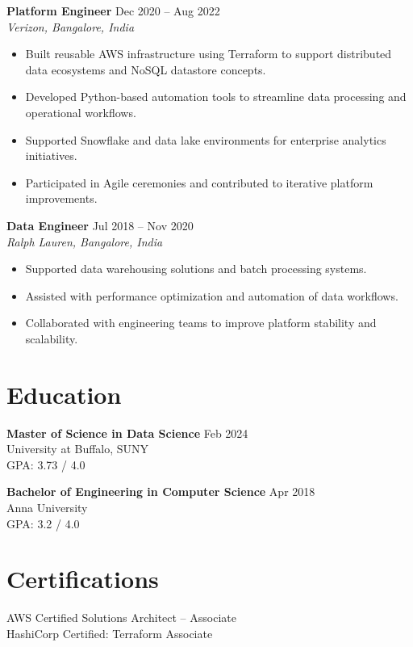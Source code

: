 \documentclass[10pt]{article}
\begin{document}
\textbf{Platform Engineer} \hfill Dec 2020 -- Aug 2022 \\
\textit{Verizon, Bangalore, India}
\begin{itemize}[leftmargin=*, itemsep=3pt]
    \item Built reusable AWS infrastructure using Terraform to support distributed data ecosystems and NoSQL datastore concepts.
    \item Developed Python-based automation tools to streamline data processing and operational workflows.
    \item Supported Snowflake and data lake environments for enterprise analytics initiatives.
    \item Participated in Agile ceremonies and contributed to iterative platform improvements.
\end{itemize}

\textbf{Data Engineer} \hfill Jul 2018 -- Nov 2020 \\
\textit{Ralph Lauren, Bangalore, India}
\begin{itemize}[leftmargin=*, itemsep=3pt]
    \item Supported data warehousing solutions and batch processing systems.
    \item Assisted with performance optimization and automation of data workflows.
    \item Collaborated with engineering teams to improve platform stability and scalability.
\end{itemize}

\section*{Education}

\textbf{Master of Science in Data Science} \hfill Feb 2024 \\
University at Buffalo, SUNY \\
GPA: 3.73 / 4.0

\textbf{Bachelor of Engineering in Computer Science} \hfill Apr 2018 \\
Anna University \\
GPA: 3.2 / 4.0

\section*{Certifications}
AWS Certified Solutions Architect – Associate \\
HashiCorp Certified: Terraform Associate
\end{document}
